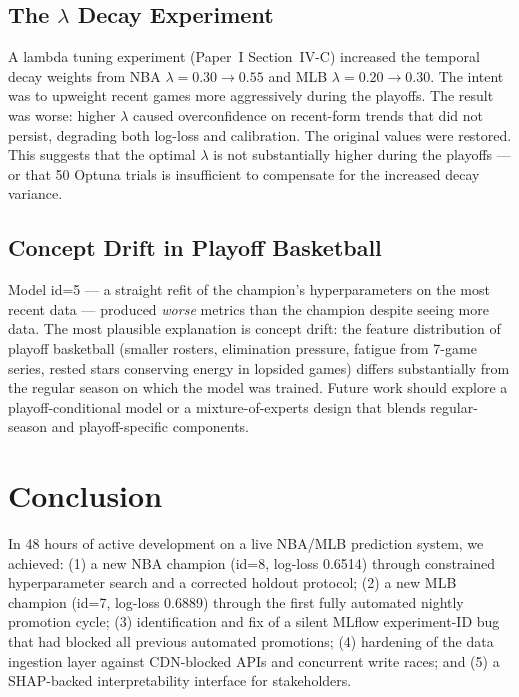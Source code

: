 \documentclass[conference]{IEEEtran}
\begin{document}
\subsection{The $\lambda$ Decay Experiment}

A lambda tuning experiment (Paper~I Section~IV-C) increased the
temporal decay weights from NBA $\lambda{=}0.30 \to 0.55$ and MLB
$\lambda{=}0.20 \to 0.30$.  The intent was to upweight recent games
more aggressively during the playoffs.  The result was worse: higher
$\lambda$ caused overconfidence on recent-form trends that did not
persist, degrading both log-loss and calibration.  The original values
were restored.  This suggests that the optimal $\lambda$ is not
substantially higher during the playoffs — or that 50 Optuna trials
is insufficient to compensate for the increased decay variance.

\subsection{Concept Drift in Playoff Basketball}

Model id=5 — a straight refit of the champion's hyperparameters on
the most recent data — produced \emph{worse} metrics than the
champion despite seeing more data.  The most plausible explanation is
concept drift: the feature distribution of playoff basketball (smaller
rosters, elimination pressure, fatigue from 7-game series, rested
stars conserving energy in lopsided games) differs substantially from
the regular season on which the model was trained.  Future work should
explore a playoff-conditional model or a mixture-of-experts design
that blends regular-season and playoff-specific components.

\section{Conclusion}
\label{sec:conclusion}

In 48 hours of active development on a live NBA/MLB prediction
system, we achieved: (1) a new NBA champion (id=8, log-loss 0.6514)
through constrained hyperparameter search and a corrected holdout
protocol; (2) a new MLB champion (id=7, log-loss 0.6889) through the
first fully automated nightly promotion cycle; (3) identification and
fix of a silent MLflow experiment-ID bug that had blocked all
previous automated promotions; (4) hardening of the data ingestion
layer against CDN-blocked APIs and concurrent write races; and (5) a
SHAP-backed interpretability interface for stakeholders.
\end{document}
